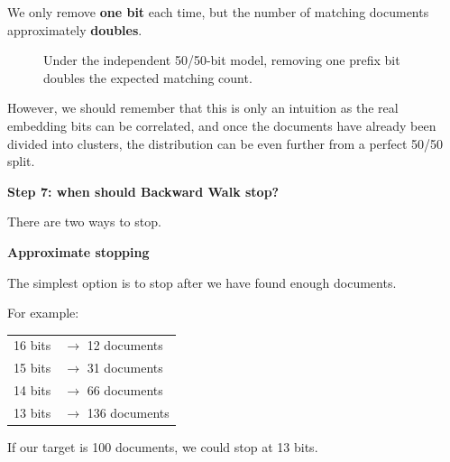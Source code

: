We only remove \textbf{one bit} each time, but the number of matching documents approximately \textbf{doubles}.

\begin{figure}[htbp]\centering
{}
\caption{Under the independent 50/50-bit model, removing one prefix bit doubles the expected matching count. }
\end{figure}

However, we should remember that this is only an intuition as the real embedding bits can be correlated, and once the documents have already been divided into clusters, the distribution can be even further from a perfect 50/50 split.



\textbf{Step 7: when should Backward Walk stop?}\par
There are two ways to stop.

\textbf{Approximate stopping}\par
The simplest option is to stop after we have found enough documents.

For example:
\begin{center}
\begin{tabular}{@{}rl@{}}
16 bits & $\to$ 12 documents\\
15 bits & $\to$ 31 documents\\
14 bits & $\to$ 66 documents\\
13 bits & $\to$ 136 documents
\end{tabular}
\end{center}
If our target is 100 documents, we could stop at 13 bits.

